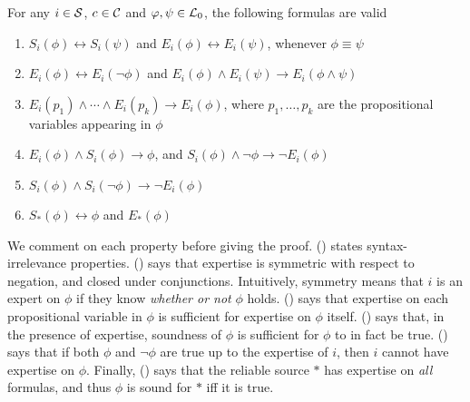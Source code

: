 \begin{proposition}
\label{prop:validities}
For any $i \in \S$, $c \in \C$ and $\phi, \psi \in \lprop$, the following
formulas are valid
\begin{enumerate}
    \item \label{item:replacement_equivalents_e_s}
          $S_i(\phi) \leftrightarrow S_i(\psi)$ and $E_i(\phi) \leftrightarrow
          E_i(\psi)$, whenever $\phi \equiv \psi$
    \item \label{item:e_symmetric}
          $E_i(\phi) \leftrightarrow E_i(\neg \phi)$ and $E_i(\phi) \land
          E_i(\psi) \rightarrow E_i(\phi \land \psi)$
    \item \label{item:exp_on_all_variables} $E_i(p_1) \land \cdots \land
          E_i(p_k) \rightarrow E_i(\phi)$, where $p_1, \ldots, p_k$ are the
          propositional variables appearing in $\phi$
    \item \label{item:e_and_s_implies_phi}
          $E_i(\phi) \land S_i(\phi) \rightarrow \phi$, and
          $S_i(\phi) \land \neg \phi \rightarrow \neg E_i(\phi)$
    \item \label{item:sound_neg_pair}
          $S_i(\phi) \land S_i(\neg \phi) \rightarrow \neg E_i(\phi)$
    \item \label{item:star_exp}
          $S_\ast(\phi) \leftrightarrow \phi$ and $E_\ast(\phi)$
\end{enumerate}
\end{proposition}

We comment on each property before giving the proof.
() states syntax-irrelevance
properties.
%
() says that expertise is symmetric with respect to
negation, and closed under conjunctions. Intuitively, symmetry means that $i$
is an expert on $\phi$ if they know \emph{whether or not} $\phi$ holds.
%
() says that expertise on each
propositional variable in $\phi$ is sufficient for expertise on $\phi$ itself.
%
() says that, in the presence of expertise,
soundness of $\phi$ is sufficient for $\phi$ to in fact be true.
%
() says that if both $\phi$ and $\neg\phi$ are
true up to the expertise of $i$, then $i$ cannot have expertise on $\phi$.
%
Finally, () says that the reliable source $\ast$ has
expertise on \emph{all} formulas, and thus $\phi$ is sound for $\ast$ iff it is
true.

